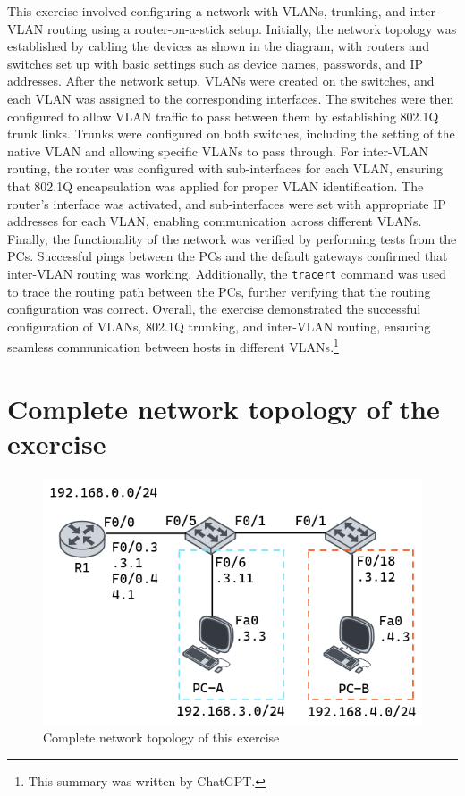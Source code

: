 \documentclass[a4paper]{article}
\newcommand{\abc}{\hfill \break}
\begin{document}
This exercise involved configuring a network with VLANs, trunking, and inter-VLAN routing using a router-on-a-stick setup. Initially, the network topology was established by cabling the devices as shown in the diagram, with routers and switches set up with basic settings such as device names, passwords, and IP addresses.\abc
After the network setup, VLANs were created on the switches, and each VLAN was assigned to the corresponding interfaces. The switches were then configured to allow VLAN traffic to pass between them by establishing 802.1Q trunk links. Trunks were configured on both switches, including the setting of the native VLAN and allowing specific VLANs to pass through.\abc
For inter-VLAN routing, the router was configured with sub-interfaces for each VLAN, ensuring that 802.1Q encapsulation was applied for proper VLAN identification. The router's interface was activated, and sub-interfaces were set with appropriate IP addresses for each VLAN, enabling communication across different VLANs.\abc
Finally, the functionality of the network was verified by performing tests from the PCs. Successful pings between the PCs and the default gateways confirmed that inter-VLAN routing was working. Additionally, the \texttt{tracert} command was used to trace the routing path between the PCs, further verifying that the routing configuration was correct.\abc
Overall, the exercise demonstrated the successful configuration of VLANs, 802.1Q trunking, and inter-VLAN routing, ensuring seamless communication between hosts in different VLANs.\footnote{This summary was written by ChatGPT.}


\newpage

\section{Complete network topology of the exercise}

\begin{figure}[h]
	\includegraphics[scale=0.8]{images/tpologie.png}
	\centering
	\caption{Complete network topology of this exercise}
\end{figure}
\end{document}
